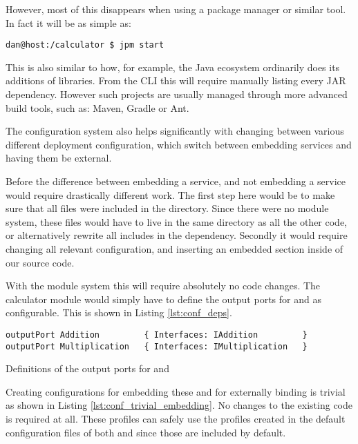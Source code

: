 However, most of this disappears when using a package manager or similar tool.
In fact it will be as simple as:

\begin{verbatim}
dan@host:/calculator $ jpm start
\end{verbatim}

This is also similar to how, for example, the Java ecosystem ordinarily does
its additions of libraries. From the CLI this will require manually listing
every JAR dependency. However such projects are usually managed through more
advanced build tools, such as: Maven, Gradle or Ant.

The configuration system also helps significantly with changing between various
different deployment configuration, which switch between embedding services and
having them be external.

Before the difference between embedding a service, and not embedding a service
would require drastically different work. The first step here would be to make
sure that all files were included in the directory. Since there were no module
system, these files would have to live in the same directory as all the other
code, or alternatively rewrite all includes in the dependency.
Secondly it would require changing all relevant configuration, and inserting
an embedded section inside of our source code.

With the module system this will require absolutely no code changes. The
calculator module would simply have to define the output ports for
 and  as configurable. This is shown in
Listing \ref{lst:conf_deps}.

\begin{listing}[H]
\begin{verbatim}
outputPort Addition         { Interfaces: IAddition         }
outputPort Multiplication   { Interfaces: IMultiplication   }
\end{verbatim}
\caption{Definitions of the output ports for  and
    }
\label{lst:conf_deps}

\end{listing}

Creating configurations for embedding these and for externally binding is
trivial as shown in Listing \ref{lst:conf_trivial_embedding}. No changes to the
existing code is required at all. These profiles can safely use the
 profiles created in the default configuration files of both
 and  since those are included by default.

